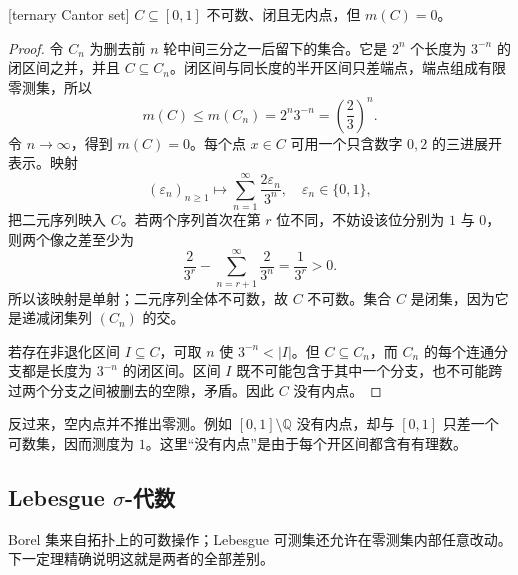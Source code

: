 \begin{proposition}
\label{b1:prop:cantor-null}
[ternary Cantor set] \(C\subseteq[0,1]\) 不可数、闭且无内点，但 \(m(C)=0\)。
\end{proposition}
\begin{proof}
令 \(C_n\) 为删去前 \(n\) 轮中间三分之一后留下的集合。它是 \(2^n\) 个长度为 \(3^{-n}\) 的闭区间之并，并且 \(C\subseteq C_n\)。闭区间与同长度的半开区间只差端点，端点组成有限零测集，所以
\[
m(C)\leq m(C_n)=2^n3^{-n}=\left(\frac23\right)^n.
\]
令 \(n\to\infty\)，得到 \(m(C)=0\)。每个点 \(x\in C\) 可用一个只含数字 \(0,2\) 的三进展开表示。映射
\[
(\varepsilon_n)_{n\geq1}\longmapsto
\sum_{n=1}^{\infty}\frac{2\varepsilon_n}{3^n},
\quad \varepsilon_n\in\{0,1\},
\]
把二元序列映入 \(C\)。若两个序列首次在第 \(r\) 位不同，不妨设该位分别为 \(1\) 与 \(0\)，则两个像之差至少为
\[
\frac{2}{3^r}-\sum_{n=r+1}^{\infty}\frac{2}{3^n}
=\frac{1}{3^r}>0.
\]
所以该映射是单射；二元序列全体不可数，故 \(C\) 不可数。集合 \(C\) 是闭集，因为它是递减闭集列 \((C_n)\) 的交。

若存在非退化区间 \(I\subseteq C\)，可取 \(n\) 使 \(3^{-n}<|I|\)。但 \(C\subseteq C_n\)，而 \(C_n\) 的每个连通分支都是长度为 \(3^{-n}\) 的闭区间。区间 \(I\) 既不可能包含于其中一个分支，也不可能跨过两个分支之间被删去的空隙，矛盾。因此 \(C\) 没有内点。
\end{proof}

反过来，空内点并不推出零测。例如 \([0,1]\setminus\mathbb Q\) 没有内点，却与 \([0,1]\) 只差一个可数集，因而测度为 \(1\)。这里“没有内点”是由于每个开区间都含有有理数。

\subsection{Lebesgue \texorpdfstring{\(\sigma\)}{\AnalysisPdfSigma}-代数}
\label{b1:subsec:030204}

Borel 集来自拓扑上的可数操作；Lebesgue 可测集还允许在零测集内部任意改动。下一定理精确说明这就是两者的全部差别。


